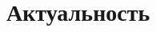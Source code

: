 \section{Актуальность}

\begin{frame}
\frametitle{\insertsection} 
\framesubtitle{\insertsubsection}
\end{frame}